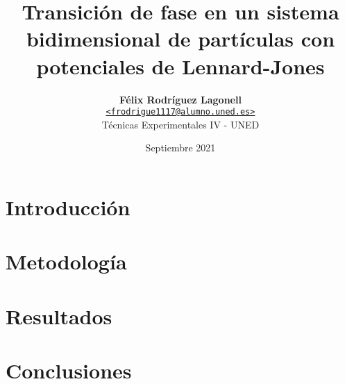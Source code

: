 \documentclass[a4paper, twocolumn]{article}
\title{\vspace{-1.5em}\textbf{Transición de fase en un sistema bidimensional de partículas con potenciales de Lennard-Jones}}
\author{{\textbf{Félix Rodríguez Lagonell}} \\
        {\href{mailto:erija578@student.liu.se}
        {\texttt{<frodrigue1117@alumno.uned.es>}}} \\
        {Técnicas Experimentales IV - UNED}}
\date{Septiembre 2021}
\begin{document}
    \maketitle

    \begin{abstract}  \end{abstract} %
    \section{Introducción} \label{sec:introduction} 
    \section{Metodología} \label{sec:related_work} 
    \section{Resultados} \label{sec:results} 
    \section{Conclusiones} \label{sec:conclusions} 

    \nocite{*} %
    
    
    \appendix

    
\end{document}

